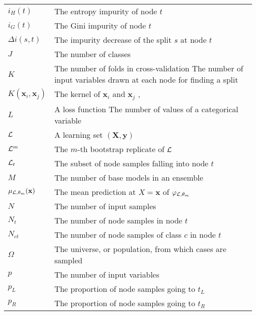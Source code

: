 \begin{tabularx}{\textwidth}{ l X }
$i_H(t)$ & The entropy impurity of node $t$ \dotfill  \pageref{eqn:impurity:shannon}\\
$i_G(t)$ & The Gini impurity of node $t$ \dotfill  \pageref{eqn:impurity:gini}\\
$\Delta i(s, t)$ & The impurity decrease of the split $s$ at node $t$ \dotfill  \pageref{def:impurity-decrease}\\
$J$ & The number of classes \dotfill  \pageref{ntn:J}\\
$K$ & The number of folds in cross-validation \dotfill  \pageref{ntn:K-cv} \newline The number of input variables drawn at each node for finding a split \dotfill \pageref{ntn:K-split} \\
$K(\mathbf{x}_i, \mathbf{x}_j)$ & The kernel of $\mathbf{x}_i$ and $\mathbf{x}_j$ \dotfill \pageref{ntn:kernel}, \pageref{ntn:kernel2}\\
$L$ & A loss function \dotfill  \pageref{ntn:L}\newline The number of values of a categorical variable \dotfill \pageref{ntn:L2}\\
${\cal L}$ & A learning set $(\mathbf{X}, \mathbf{y})$ \dotfill  \pageref{ntn:learning-set}\\
${\cal L}^m$ & The $m$-th bootstrap replicate of ${\cal L}$ \dotfill  \pageref{ntn:L_m}\\
${\cal L}_t$ & The subset of node samples falling into node $t$ \dotfill  \pageref{ntn:L_t}\\
$M$ & The number of base models in an ensemble \dotfill  \pageref{ntn:M}\\
$\mu_{{\cal L},\theta_m}(\mathbf{x})$ & The mean prediction at $X = \mathbf{x}$ of $\varphi_{{\cal L},\theta_m}$ \dotfill \pageref{eqn:4:mu} \\
$N$ & The number of input samples \dotfill  \pageref{ntn:N}\\
$N_t$ & The number of node samples in node $t$ \dotfill  \pageref{ntn:N_t}\\
$N_{ct}$ & The number of node samples of class $c$ in node $t$ \dotfill  \pageref{ntn:N_ct}\\
$\Omega$ & The universe, or population, from which cases are sampled \dotfill  \pageref{ntn:omega}\\
$p$ & The number of input variables \dotfill  \pageref{ntn:p}\\
$p_L$ & The proportion of node samples going to $t_L$ \dotfill  \pageref{ntn:p_L}\\
$p_R$ & The proportion of node samples going to $t_R$ \dotfill  \pageref{ntn:p_R}\\

\end{tabularx}

